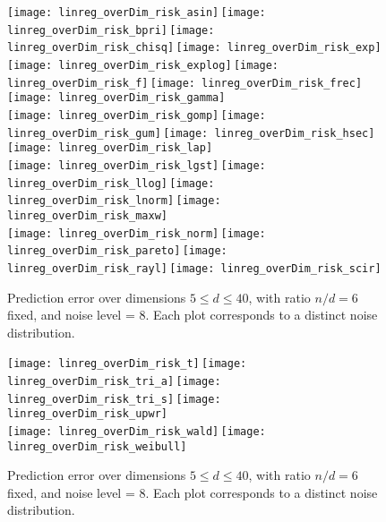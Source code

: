 \documentclass[11pt,oneside]{article}
\theoremstyle{definition} \newtheorem{defn}{Definition}       %
\theoremstyle{plain} \newtheorem{prop}[defn]{Proposition}           %
\theoremstyle{plain} \newtheorem{thm}[defn]{Theorem}                %
\theoremstyle{plain} \newtheorem{lem}[defn]{Lemma}                  %
\theoremstyle{plain} \newtheorem{cor}[defn]{Corollary}              %
\theoremstyle{remark} \newtheorem{rmk}[defn]{Remark}                %
\theoremstyle{remark} \newtheorem{ex}[defn]{Example}                %
\begin{document}
\clearpage


\begin{figure}[t]
\centering
\texttt{[image: linreg\_overDim\_risk\_asin]}\,\texttt{[image: linreg\_overDim\_risk\_bpri]}\,\texttt{[image: linreg\_overDim\_risk\_chisq]}\,\texttt{[image: linreg\_overDim\_risk\_exp]}\\
\texttt{[image: linreg\_overDim\_risk\_explog]}\,\texttt{[image: linreg\_overDim\_risk\_f]}\,\texttt{[image: linreg\_overDim\_risk\_frec]}\,\texttt{[image: linreg\_overDim\_risk\_gamma]}\\
\texttt{[image: linreg\_overDim\_risk\_gomp]}\,\texttt{[image: linreg\_overDim\_risk\_gum]}\,\texttt{[image: linreg\_overDim\_risk\_hsec]}\,\texttt{[image: linreg\_overDim\_risk\_lap]}\\
\texttt{[image: linreg\_overDim\_risk\_lgst]}\,\texttt{[image: linreg\_overDim\_risk\_llog]}\,\texttt{[image: linreg\_overDim\_risk\_lnorm]}\,\texttt{[image: linreg\_overDim\_risk\_maxw]}\\
\texttt{[image: linreg\_overDim\_risk\_norm]}\,\texttt{[image: linreg\_overDim\_risk\_pareto]}\,\texttt{[image: linreg\_overDim\_risk\_rayl]}\,\texttt{[image: linreg\_overDim\_risk\_scir]}
\caption{Prediction error over dimensions $5 \leq d \leq 40$, with ratio $n/d = 6$ fixed, and noise level = $8$. Each plot corresponds to a distinct noise distribution.}
\label{fig:overDim_all_distros_1}
\end{figure}

\clearpage

\begin{figure}[t]
\centering
\texttt{[image: linreg\_overDim\_risk\_t]}\,\texttt{[image: linreg\_overDim\_risk\_tri\_a]}\,\texttt{[image: linreg\_overDim\_risk\_tri\_s]}\,\texttt{[image: linreg\_overDim\_risk\_upwr]}\\
\texttt{[image: linreg\_overDim\_risk\_wald]}\,\texttt{[image: linreg\_overDim\_risk\_weibull]}
\caption{Prediction error over dimensions $5 \leq d \leq 40$, with ratio $n/d = 6$ fixed, and noise level = $8$. Each plot corresponds to a distinct noise distribution.}
\label{fig:overDim_all_distros_2}
\end{figure}

\clearpage
\end{document}
